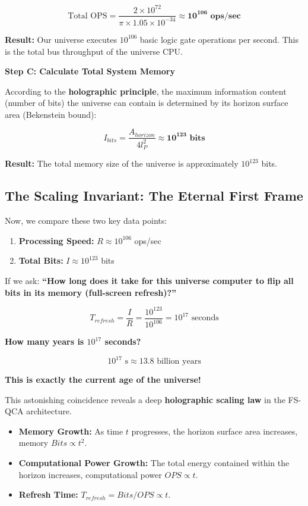 \documentclass[11pt,a4paper,twoside]{book}
\begin{document}
$$\text{Total OPS} = \frac{2 \times 10^{72}}{\pi \times 1.05 \times 10^{-34}} \approx \mathbf{10^{106} \text{ ops/sec}}$$

\textbf{Result:} Our universe executes \textbf{$10^{106}$} basic logic gate operations per second. This is the total bus throughput of the universe CPU.

\textbf{Step C: Calculate Total System Memory}

According to the \textbf{holographic principle}, the maximum information content (number of bits) the universe can contain is determined by its horizon surface area (Bekenstein bound):

$$I_{bits} = \frac{A_{horizon}}{4 l_P^2} \approx \mathbf{10^{123} \text{ bits}}$$

\textbf{Result:} The total memory size of the universe is approximately \textbf{$10^{123}$} bits.

\subsection{The Scaling Invariant: The Eternal First Frame}

Now, we compare these two key data points:

\begin{enumerate}
\item \textbf{Processing Speed:} $R \approx 10^{106}$ ops/sec

\item \textbf{Total Bits:} $I \approx 10^{123}$ bits
\end{enumerate}

If we ask: \textbf{``How long does it take for this universe computer to flip all bits in its memory (full-screen refresh)?''}

$$T_{refresh} = \frac{I}{R} = \frac{10^{123}}{10^{106}} = 10^{17} \text{ seconds}$$

\textbf{How many years is $10^{17}$ seconds?}

$$10^{17} \text{ s} \approx 13.8 \text{ billion years}$$

\textbf{This is exactly the current age of the universe!}

This astonishing coincidence reveals a deep \textbf{holographic scaling law} in the FS-QCA architecture.

\begin{itemize}
\item \textbf{Memory Growth:} As time $t$ progresses, the horizon surface area increases, memory $Bits \propto t^2$.

\item \textbf{Computational Power Growth:} The total energy contained within the horizon increases, computational power $OPS \propto t$.

\item \textbf{Refresh Time:} $T_{refresh} = Bits / OPS \propto t$.
\end{itemize}
\end{document}
